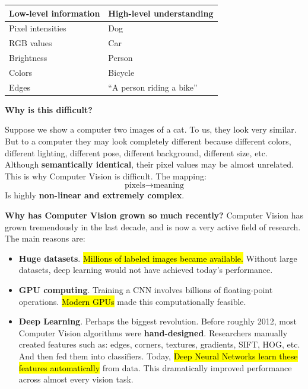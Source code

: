 \begin{center}
    \begin{tabular}{@{} l | l @{}}
        \toprule
        Low-level information & High-level understanding \\
        \midrule
        Pixel intensities & Dog \\
        RGB values & Car \\
        Brightness & Person \\
        Colors & Bicycle \\
        Edges & ``A person riding a bike'' \\
        \bottomrule
    \end{tabular}
\end{center}

\highspace
\begin{flushleft}
    \textcolor{Green3}{ \textbf{Why is this difficult?}}
\end{flushleft}
Suppose we show a computer two images of a cat. To us, they look very similar. But to a computer they may look completely different because different colors, different lighting, different pose, different background, different size, etc. Although \textbf{semantically identical}, their pixel values may be almost unrelated. This is why Computer Vision is difficult. The mapping:
\begin{equation*}
    \text{pixels} \to \text{meaning}
\end{equation*}
Is highly \textbf{non-linear and extremely complex}.

\highspace
\textcolor{Green3}{ \textbf{Why has Computer Vision grown so much recently?}} Computer Vision has grown tremendously in the last decade, and is now a very active field of research. The main reasons are:
\begin{itemize}
    \item \textbf{Huge datasets}. \hl{Millions of labeled images became available.} Without large datasets, deep learning would not have achieved today's performance.
    \item \textbf{GPU computing}. Training a CNN involves billions of floating-point operations. \hl{Modern GPUs} made this computationally feasible.
    \item \textbf{Deep Learning}. Perhaps the biggest revolution. Before roughly 2012, most Computer Vision algorithms were \textbf{hand-designed}. Researchers manually created features such as: edges, corners, textures, gradients, SIFT, HOG, etc. And then fed them into classifiers. Today, \hl{Deep Neural Networks learn these features automatically} from data. This dramatically improved performance across almost every vision task.
\end{itemize}

